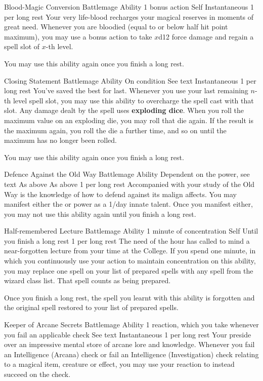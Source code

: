 \ability%
    {Blood-Magic Conversion}
    {Battlemage Ability}
    {1 bonus action}
    {Self}
    {Instantaneous}
    {1 per long rest}
Your very life-blood recharges your magical reserves
in moments of great need.
Whenever you are bloodied (equal to or below half hit point maximum),
you may use a bonus action to take $x$d12 force damage
and regain a spell slot of $x$-th level.

You may use this ability again once you finish a long rest.


\ability%
    {Closing Statement}
    {Battlemage Ability}
    {On condition}
    {See text}
    {Instantaneous}
    {1 per long rest}
You've saved the best for last.
Whenever you use your last remaining $n$-th level spell slot,
you may use this ability to overcharge the spell cast with that slot.
Any damage dealt by the spell uses \textbf{exploding dice}.
When you roll the maximum value on an exploding die,
you may roll that die again.
If the result is the maximum again,
you roll the die a further time,
and so on until the maximum has no longer been rolled.

You may use this ability again once you finish a long rest.


\ability%
    {Defence Against the Old Way}
    {Battlemage Ability}
    {Dependent on the power, see text}
    {As above}
    {As above}
    {1 per long rest}
Accompanied with your study of the Old Way is the knowledge
of how to defend against its malign affects. You may manifest
either the  or  power
as a 1/day innate talent. Once you manifest either, you may not
use this ability again until you finish a long rest.

\ability%
    {Half-remembered Lecture}
    {Battlemage Ability}
    {1 minute of concentration}
    {Self}
    {Until you finish a long rest}
    {1 per long rest}
The need of the hour has called to mind
a near-forgotten lecture from your time at the College.
If you spend one minute, in which you continuously use your action
to maintain concentration on this ability,
you may replace one spell on your list of prepared spells
with any spell from the wizard class list.
That spell counts as being prepared.

Once you finish a long rest,
the spell you learnt with this ability is forgotten
and the original spell restored to your list of prepared spells.


\ability%
    {Keeper of Arcane Secrets}
    {Battlemage Ability}
    {1 reaction, which you take whenever you fail an applicable check}
    {See text}
    {Instantaneous}
    {1 per long rest}
Your preside over an impressive mental store
of arcane lore and knowledge.
Whenever you fail an Intelligence (Arcana) check
or fail an Intelligence (Investigation) check relating
to a magical item, creature or effect,
you may use your reaction to instead succeed on the check.

